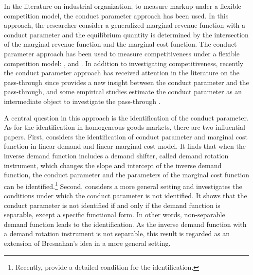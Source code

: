 \documentclass[11pt, a4paper]{article}
\theoremstyle{remark}
\begin{document}
In the literature on industrial organization, to measure markup under a flexible competition model, the conduct parameter approach has been used.
In this approach, the researcher consider a generalized marginal revenue function with a conduct parameter and the equilibrium quantity is determined by the intersection of the marginal revenue function and the marginal cost function.
The conduct parameter approach has been used to measure competitiveness under a flexible competition model: \citet{porterStudy1983}, \citet{genesove1998testing} and \citet{okazaki2022excess}.
In addition to investigating competitiveness, recently the conduct parameter approach has received attention in the literature on the pass-through since \citet{weylPassThrough2013} provides a new insight between the conduct parameter and the pass-through, and some empirical studies estimate the conduct parameter as an intermediate object to investigate the pass-through \citep{millerPassthrough2017}.

A central question in this approach is the identification of the conduct parameter.
As for the identification in homogeneous goods markets, there are two influential papers.
First, \citet{bresnahan1982oligopoly} considers the identification of conduct parameter and marginal cost function in linear demand and linear marginal cost model.
It finds that when the inverse demand function includes a demand shifter, called demand rotation instrument, which changes the slope and intercept of the inverse demand function, the conduct parameter and the parameters of the marginal cost function can be identified.\footnote{Recently, \citet{matsumura2023resolving} provide a detailed condition for the identification.}
Second, \citet{lau1982identifying} considers a more general setting and investigates the conditions under which the conduct parameter is not identified.
It shows that the conduct parameter is not identified if and only if the demand function is separable, except a specific functional form.
In other words, non-separable demand function leads to the identification.
As the inverse demand function with a demand rotation instrument is not separable, this result is regarded as an extension of Bresnahan's idea in a more general setting.
\end{document}
